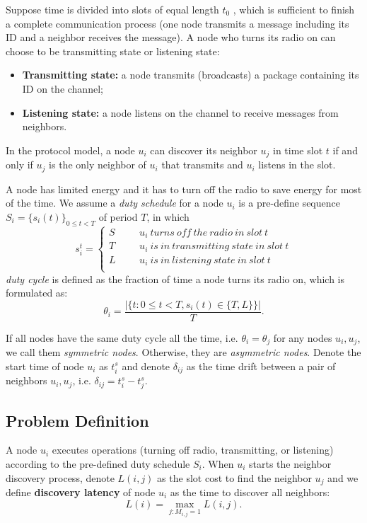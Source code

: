 Suppose time is divided into slots of equal length $t_0$ \cite{van2004lightweight}, which is sufficient to finish a complete communication process (one node transmits a message including its ID and a neighbor receives the message). 
A node who turns its radio on can choose to be transmitting state or listening state:
\begin{itemize}
\item \textbf{Transmitting state:} a node transmits (broadcasts) a package containing its ID on the channel;
\item  \textbf{Listening state:} a node listens on the channel to receive messages from neighbors.
\end{itemize}
In the protocol model, a node $u_i$ can discover its neighbor $u_j$ in time slot $t$ if and only if $u_j$ is the only neighbor of $u_i$ that transmits and $u_i$ listens in the slot.

A node has limited energy and it has to turn off the radio to save energy for most of the time. We assume a \emph{duty schedule} for a node $u_i$ is a pre-define sequence $S_i=\{s_i(t)\}_{0\leq t<T}$ of period $T$, in which
$$ s_i^t=\left\{
\begin{aligned}
S  & & & {u_i ~turns~ off~ the~ radio~ in~ slot~ t}  	 \\
T  & & & {u_i ~is~ in~ transmitting~ state~ in~ slot~ t}	\\
L  & & & {u_i ~is~ in~ listening~ state~ in~ slot~ t}	\\
\end{aligned}
\right.
$$
 \emph{duty cycle} is defined as the fraction of time a node turns its radio on, which is formulated as:
$$\theta_i=\frac{|\{t: 0\leq t<T, s_i(t) \in \{T,L\}\}|}{T}.
$$

If all nodes have the same duty cycle all the time, i.e. $\theta_i = \theta_j$ for any nodes $u_i, u_j$, we call them \emph{symmetric nodes}. Otherwise, they are \emph{asymmetric nodes}. Denote the start time of node $u_i$ as $t_i^s$ and denote $\delta_{ij}$ as the time drift between a pair of neighbors $u_i, u_j$, i.e. $\delta_{ij} = t_i^s - t_j^s$.

\subsection{Problem Definition}

A node $u_i$ executes operations (turning off radio, transmitting, or listening) according to the pre-defined duty schedule $S_i$. 
When $u_i$ starts the neighbor discovery process, denote $L(i,j)$ as the slot cost to find the neighbor $u_j$ and we define \textbf{discovery latency} of node $u_i$ as the time to discover all neighbors:
$$L(i) = \max_{j:M_{i,j}=1} L(i,j).
$$


